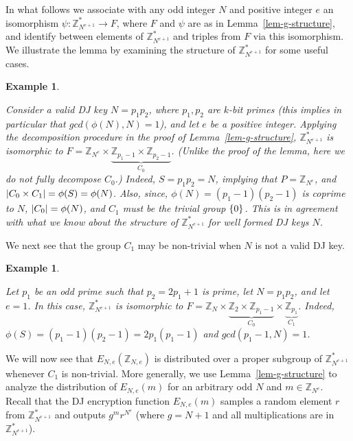 \documentclass[11pt]{article}
\newtheorem{Example}[theorem]{Example}
\newenvironment{example}{\begin{Example}\begin{rm}}{\end{rm}\end{Example}}
\newcommand{\encdj}{{E}_{N,e}}
\newcommand{\Z}{\mathbb{Z}}
\newcommand{\U}[1]{\mathbb{Z}_{#1}^*}
\newcommand{\mathify}[1]{\ifmmode{#1}\else\mbox{$#1$}\fi}
\newcommand{\set}[2][]{\mathify{{\left\{#2\right\}}^{#1}}}
\newcommand{\size}[1]{\mathify{\left| #1 \right|}}
\begin{document}
In what follows we associate with any odd integer $N$ and positive
integer $e$ an isomorphism $\psi:\U{N^{e+1}}\to F$, where $F$ and $\psi$ are as in Lemma~\ref{lem-g-structure}, and identify between
elements of $\U{N^{e+1}}$ and triples from $F$ via this
isomorphism. We illustrate the lemma by examining the structure of
$\U{N^{e+1}}$ for some useful cases.
\begin{example}
\label{ex-valid} Consider a valid DJ key $N=p_1p_2$, where
$p_1,p_2$ are $k$-bit primes (this implies in particular that
$gcd(\phi(N),N)=1$), and let $e$ be a positive integer. Applying
the decomposition procedure in the proof of
Lemma~\ref{lem-g-structure}, $\U{N^{e+1}}$ is isomorphic to
$F=\Z_{N^e}\times \underbrace{\Z_{p_1-1}\times\Z_{p_2-1}}_{C_0}$.
(Unlike the proof of the lemma, here we do not fully decompose
$C_0$.) Indeed, $S=p_1p_2=N$, implying that $P=\Z_{N^e}$, and
$\size{C_0\times C_1}=\phi(S)=\phi(N)$. Also, since,
$\phi(N)=(p_1-1)(p_2-1)$ is coprime to $N$, $\size{C_0}=\phi(N)$,
and $C_1$ must be the trivial group $\set{0}$. This is in agreement
with what we know about the structure of $\U{N^{e+1}}$ for well
formed DJ keys $N$.
\end{example}
We next see that the group $C_1$ may be non-trivial when $N$ is not
a valid DJ key.
\begin{example}
\label{ex-harmful} Let $p_1$ be an odd prime such that $p_2=2p_1+1$
is prime, let $N=p_1p_2$, and let $e=1$. In this case,
$\U{N^{e+1}}$ is isomorphic to
$F=\Z_N\times\underbrace{\Z_2\times\Z_{p_1-1}}_{C_0}\times
\underbrace{\Z_{p_1}}_{C_1}$. Indeed,
$\phi(S)=(p_1-1)(p_2-1)=2p_1(p_1-1)$ and $gcd(p_1-1,N)=1$.
\end{example}

We will now see that $\encdj(\Z_{N,e})$ is distributed over a
proper subgroup of $\U{N^{e+1}}$ whenever $C_1$ is non-trivial.
More generally, we use Lemma~\ref{lem-g-structure} to analyze the
distribution of $\encdj(m)$ for an arbitrary odd $N$ and
$m\in\Z_{N^e}$. Recall that the DJ encryption function $\encdj(m)$
samples a random element $r$ from ${\U{N^{e+1}}}$ and outputs
$g^mr^{N^e}$ (where $g=N+1$ and all multiplications are in
$\U{N^{e+1}}$).
\end{document}
